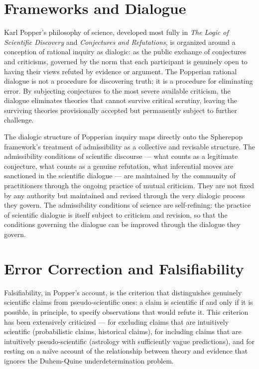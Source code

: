\documentclass[12pt,openany]{book}
\theoremstyle{plain}
\theoremstyle{definition}
\theoremstyle{remark}
\begin{document}
\section{Frameworks and Dialogue}

Karl Popper's philosophy of science, developed most fully in \emph{The Logic of Scientific Discovery} and \emph{Conjectures and Refutations}, is organized around a conception of rational inquiry as dialogic: as the public exchange of conjectures and criticisms, governed by the norm that each participant is genuinely open to having their views refuted by evidence or argument. The Popperian rational dialogue is not a procedure for discovering truth; it is a procedure for eliminating error. By subjecting conjectures to the most severe available criticism, the dialogue eliminates theories that cannot survive critical scrutiny, leaving the surviving theories provisionally accepted but permanently subject to further challenge.

The dialogic structure of Popperian inquiry maps directly onto the Spherepop framework's treatment of admissibility as a collective and revisable structure. The admissibility conditions of scientific discourse — what counts as a legitimate conjecture, what counts as a genuine refutation, what inferential moves are sanctioned in the scientific dialogue — are maintained by the community of practitioners through the ongoing practice of mutual criticism. They are not fixed by any authority but maintained and revised through the very dialogic process they govern. The admissibility conditions of science are self-refining: the practice of scientific dialogue is itself subject to criticism and revision, so that the conditions governing the dialogue can be improved through the dialogue they govern.

\section{Error Correction and Falsifiability}

Falsifiability, in Popper's account, is the criterion that distinguishes genuinely scientific claims from pseudo-scientific ones: a claim is scientific if and only if it is possible, in principle, to specify observations that would refute it. This criterion has been extensively criticized — for excluding claims that are intuitively scientific (probabilistic claims, historical claims), for including claims that are intuitively pseudo-scientific (astrology with sufficiently vague predictions), and for resting on a naïve account of the relationship between theory and evidence that ignores the Duhem-Quine underdetermination problem.
\end{document}
